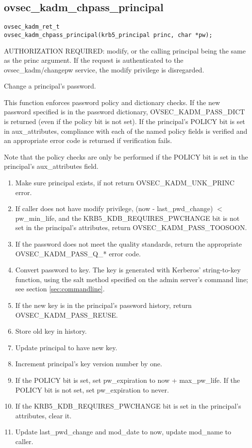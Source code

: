 \subsection{ovsec_kadm_chpass_principal}

\begin{verbatim}
ovsec_kadm_ret_t
ovsec_kadm_chpass_principal(krb5_principal princ, char *pw);
\end{verbatim}

AUTHORIZATION REQUIRED: modify, or the calling principal being the
same as the princ argument.  If the request is authenticated to the
ovsec_kadm/changepw service, the modify privilege is disregarded.

Change a principal's password.  

This function enforces password policy and dictionary checks.  If the
new password specified is in the password dictionary,
OVSEC_KADM_PASS_DICT is returned (even if the policy bit is not set).
If the principal's POLICY bit is set in aux_attributes, compliance
with each of the named policy fields is verified and an appropriate
error code is returned if verification fails.

Note that the policy checks are only be performed if the POLICY bit is
set in the principal's aux_attributes field.

\begin{enumerate}
\item Make sure principal exists, if not return OVSEC_KADM_UNK_PRINC error.
\item If caller does not have modify privilege, (now - last_pwd_change) $<$
pw_min_life, and the KRB5_KDB_REQUIRES_PWCHANGE bit is not set in the
principal's attributes, return OVSEC_KADM_PASS_TOOSOON.
\item If the password does not meet the quality
standards, return the appropriate OVSEC_KADM_PASS_Q_* error code.
\item Convert password to key.  The key is generated with
Kerberos' string-to-key function, using the salt method specified on
the admin server's command line; see section \ref{sec:commandline}.
\item If the new key is in the principal's password history, return
OVSEC_KADM_PASS_REUSE.
\item Store old key in history.
\item Update principal to have new key.
\item Increment principal's key version number by one.
\item If the POLICY bit is set, set pw_expiration to now +
max_pw_life.  If the POLICY bit is not set, set pw_expiration to
never.
\item If the KRB5_KDB_REQUIRES_PWCHANGE bit is set in the principal's
attributes, clear it.
\item Update last_pwd_change and mod_date to now, update mod_name to
caller.
\end{enumerate}

